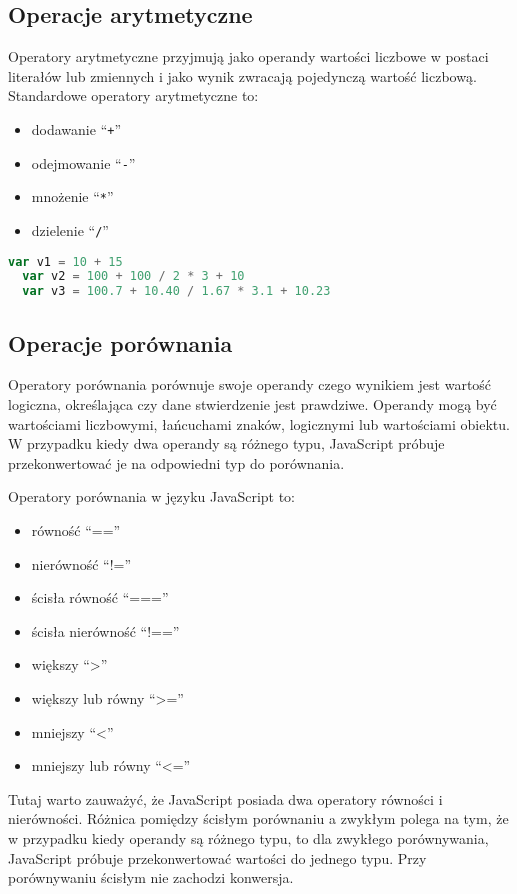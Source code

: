 \subsection{Operacje arytmetyczne}
Operatory arytmetyczne przyjmują jako operandy wartości liczbowe w postaci literałów lub zmiennych i jako wynik zwracają pojedynczą wartość liczbową. Standardowe operatory arytmetyczne to:
\begin{itemize}
  \item dodawanie ``\texttt{+}''
  \item odejmowanie ``\texttt{-}''
  \item mnożenie ``\texttt{*}''
  \item dzielenie ``\texttt{/}''
\end{itemize}

\begin{lstlisting}[language=JavaScript, caption=Przykład użycia operatorów arytmetycznych, label=alg:operatoryArytmetyczne1]
  var v1 = 10 + 15
  var v2 = 100 + 100 / 2 * 3 + 10
  var v3 = 100.7 + 10.40 / 1.67 * 3.1 + 10.23
\end{lstlisting}


\subsection{Operacje porównania}
  \par Operatory porównania porównuje swoje operandy czego wynikiem jest wartość logiczna, określająca czy dane stwierdzenie jest prawdziwe. Operandy mogą być wartościami liczbowymi, łańcuchami znaków, logicznymi lub wartościami obiektu. W przypadku kiedy dwa operandy są różnego typu, JavaScript próbuje przekonwertować je na odpowiedni typ do porównania.
  \par Operatory porównania w języku JavaScript to:
  \begin{itemize}
    \item równość ``==''
    \item nierówność ``!=''
    \item ścisła równość ``===''
    \item ścisła nierówność ``!==''
    \item większy ``>''
    \item większy lub równy ``>=''
    \item mniejszy ``<''
    \item mniejszy lub równy ``<=''
  \end{itemize}
  Tutaj warto zauważyć, że JavaScript posiada dwa operatory równości i nierówności. Różnica pomiędzy ścisłym porównaniu a zwykłym polega na tym, że w przypadku kiedy operandy są różnego typu, to dla zwykłego porównywania, JavaScript próbuje przekonwertować wartości do jednego typu. Przy porównywaniu ścisłym nie zachodzi konwersja.

